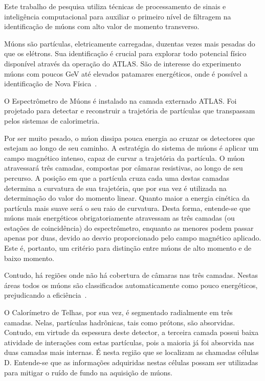Este trabalho de pesquisa utiliza técnicas de processamento de sinais e
inteligência computacional para auxiliar o primeiro nível de filtragem na
identificação de múons com alto valor de momento transverso.

Múons são partículas, eletricamente carregadas, duzentas vezes mais pesadas do
que os elétrons. Sua  identificação é crucial para explorar todo potencial
físico disponível através da operação do ATLAS. São de interesse do experimento
múons com poucos GeV até elevados patamares energéticos, onde é possível a
identificação de Nova Física~\cite{HASSANI2007}.

O Espectrômetro de Múons é instalado na camada externado ATLAS. Foi projetado
para detectar e reconstruir a trajetória de partículas que transpassam pelos
sistemas de calorimetria.

Por ser muito pesado, o múon dissipa pouca energia ao cruzar os detectores que
estejam ao longo de seu caminho. A estratégia do sistema de múons é aplicar um
campo magnético intenso, capaz de curvar a trajetória da partícula.  O múon
atravessará três camadas, compostas por câmaras resistivas,  ao longo de seu
percurso.  A posição em que a partícula cruza cada uma destas camadas determina
a curvatura de sua trajetória, que por sua vez é utilizada na determinação do
valor do momento linear. Quanto maior a energia cinética da partícula mais
suave será o seu raio de curvatura. Desta forma, entende-se que múons mais
energéticos obrigatoriamente atravessam as três camadas (ou estações de
coincidência) do espectrômetro, enquanto as menores podem passar apenas por
duas, devido ao desvio proporcionado pelo campo magnético aplicado. Este é,
portanto, um critério para distinção entre múons de alto momento e de baixo
momento.

Contudo, há regiões onde não há cobertura de câmaras nas três camadas. Nestas
áreas todos os múons são classificados automaticamente como pouco energéticos,
prejudicando a eficiência~\cite{ATLAS-CONF-2012-099}.

O Calorímetro de Telhas, por sua vez, é segmentado radialmente em três camadas.
Nelas, partículas hadrônicas, tais como prótons, são absorvidas. Contudo, em
virtude da espessura deste detector, a terceira camada possui baixa atividade de
interações com estas partículas, pois a maioria já foi absorvida nas duas
camadas mais internas. É nesta região que se localizam as chamadas células D.
Entende-se que as informações adquiridas nestas células  possam ser utilizadas
para mitigar o ruído de fundo na aquisição de múons.

